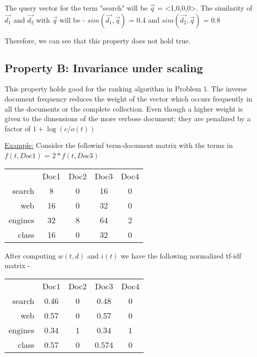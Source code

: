\documentclass{article}
\begin{document}
The query vector for the term "search" will be $\vec{q}$ = <1,0,0,0>. The similarity of $\vec{d_1}$ and $\vec{d_2}$ with ${\vec{q}}$ will be -
$sim(\vec{d_1},\vec{q})$ = 0.4 and $sim(\vec{d_2},\vec{q})$ = 0.8

Therefore, we can see that this property does not hold true. 

\subsection{\textbf{Property B: Invariance under scaling}}

This property holds good for the ranking algorithm in Problem 1. The inverse document frequency reduces the weight of the vector which occurs frequently in all the documents or the complete collection. Even though a higher weight is given to the dimensions of the more verbose document; they are penalized by a factor of $1 + \log(c/o(t))$ 

\underline{Example:}
Consider the followinf term-document matrix with the terms in $f(t,Doc1)$ = $2 * f(t,Doc3)$

\begin{tabular}{ r|c|c|c|c| }
\multicolumn{1}{r}{}
 & \multicolumn{1}{c}{Doc1}
 & \multicolumn{1}{c}{Doc2}
 & \multicolumn{1}{c}{Doc3}
 & \multicolumn{1}{c}{Doc4} \\
\cline{2-5}
search & 8 & 0 & 16 & 0 \\
\cline{2-5}
web & 16 & 0 & 32 & 0 \\
\cline{2-5}
engines & 32 & 8 & 64 & 2 \\
\cline{2-5}
class & 16 & 0 & 32 & 0 \\
\cline{2-5}
\end{tabular}

After computing $w(t,d)$ and $i(t)$ we have the following normalized tf-idf matrix -

\begin{tabular}{ r|c|c|c|c| }
\multicolumn{1}{r}{}
 & \multicolumn{1}{c}{Doc1}
 & \multicolumn{1}{c}{Doc2}
 & \multicolumn{1}{c}{Doc3}
 & \multicolumn{1}{c}{Doc4} \\
\cline{2-5}
search & 0.46 & 0 & 0.48 & 0 \\
\cline{2-5}
web & 0.57 & 0 & 0.57 & 0 \\
\cline{2-5}
engines & 0.34 & 1 & 0.34 & 1 \\
\cline{2-5}
class & 0.57 & 0 & 0.574 & 0 \\
\cline{2-5}
\end{tabular}
\end{document}
